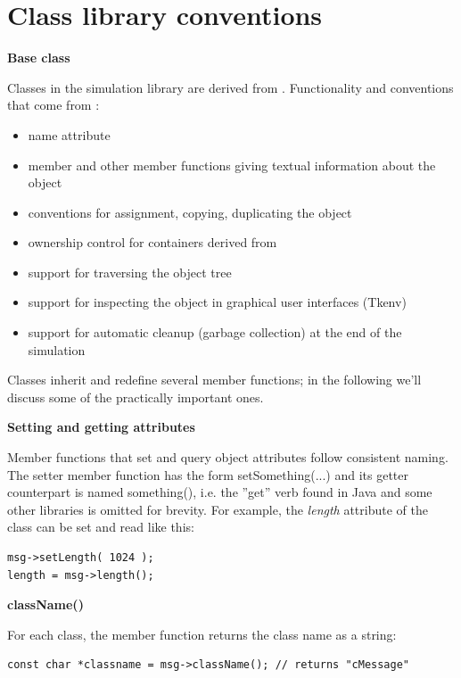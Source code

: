 \section{Class library conventions}

\textbf{Base class}


Classes in the {\opp} simulation library are derived from . 
Functionality and conventions that come from :
\begin{itemize}
  \item{name attribute}
  \item{ member and other member functions giving textual 
    information about the object}
  \item{conventions for assignment, copying, duplicating the object}
  \item{ownership control for containers derived from }
  \item{support for traversing the object tree}
  \item{support for inspecting the object in graphical user interfaces 
    (Tkenv)}
  \item{support for automatic cleanup (garbage collection) at the end 
    of the simulation}
\end{itemize}


Classes inherit and redefine several  member functions; 
in the following we'll discuss some of the practically important 
ones.


\textbf{Setting and getting attributes}


Member functions that set and query object attributes follow 
consistent naming. The setter member function has the form setSomething(...) 
and its getter counterpart is named something(), i.e. the ''get'' 
verb found in Java and some other libraries is omitted for brevity. 
For example, the \textit{length} attribute of the  class can 
be set and read like this:

\begin{Verbatim}
msg->setLength( 1024 );
length = msg->length();
\end{Verbatim}


\textbf{className()}


For each class, the  member function returns the class 
name as a string:

\begin{Verbatim}
const char *classname = msg->className(); // returns "cMessage"
\end{Verbatim}

